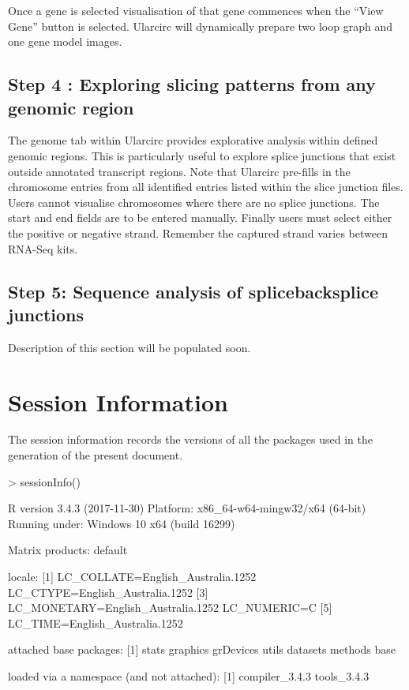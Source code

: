 \documentclass[12pt]{article}
\begin{document}
Once a gene is selected visualisation of that gene commences when the ``View Gene'' button is selected. Ularcirc will dynamically prepare two loop graph and one gene model images.




\subsection{Step 4 : Exploring slicing patterns from any genomic region} \label{sec:Step4}
The genome tab within Ularcirc provides explorative analysis within defined genomic regions. This is particularly useful to explore splice junctions that exist outside annotated transcript regions. Note that Ularcirc pre-fills in the chromosome entries from all identified entries listed within the slice junction files. Users cannot visualise chromosomes where there are no splice junctions. The start and end fields are to be entered manually. Finally users must select either the positive or negative strand. Remember the captured strand varies between RNA-Seq kits.

\subsection{Step 5: Sequence analysis of splice\/backsplice junctions} \label{sec:Step5}

Description of this section will be populated soon.

\section{Session Information} \label{sec:sessioninfo}

The session information records the versions of all the packages used in the generation of the present document.

\begin{Schunk}
\begin{Sinput}
> sessionInfo()
\end{Sinput}
\begin{Soutput}
R version 3.4.3 (2017-11-30)
Platform: x86_64-w64-mingw32/x64 (64-bit)
Running under: Windows 10 x64 (build 16299)

Matrix products: default

locale:
[1] LC_COLLATE=English_Australia.1252  LC_CTYPE=English_Australia.1252   
[3] LC_MONETARY=English_Australia.1252 LC_NUMERIC=C                      
[5] LC_TIME=English_Australia.1252    

attached base packages:
[1] stats     graphics  grDevices utils     datasets  methods   base     

loaded via a namespace (and not attached):
[1] compiler_3.4.3 tools_3.4.3   
\end{Soutput}
\end{Schunk}
\end{document}
